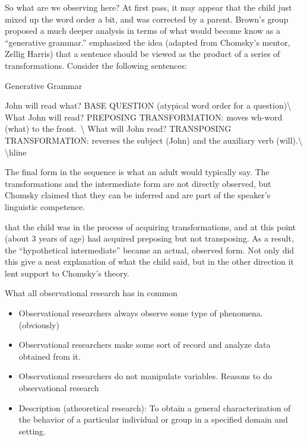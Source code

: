 \begin{refsection}
So what are we observing here? At first pass, it may appear that the child just mixed up the word order a bit, and was corrected by a parent. Brown's group proposed a much deeper analysis in terms of what would become know as a ``generative grammar.''
 emphasized the idea (adapted from Chomsky's mentor, Zellig Harris) that a sentence should be viewed as the product of a series of transformations. Consider the following sentences:

\begin{apatextbox}{Generative Grammar}

John will read what? BASE QUESTION (atypical word order for a question)\textbackslash{} What John will read? PREPOSING TRANSFORMATION: moves wh-word (what) to the front. \textbackslash{} What will John read? TRANSPOSING TRANSFORMATION: reverses the subject (John) and the auxiliary verb (will).\textbackslash{} \textbackslash{}hline
\end{apatextbox}
The final form in the sequence is what an adult would typically say. The transformations and the intermediate form are not directly observed, but Chomsky claimed that they can be inferred and are part of the speaker's linguistic competence.

 that the child was in the process of acquiring transformations, and at this point (about 3 years of age) had acquired preposing but not transposing. As a result, the ``hypothetical intermediate'' became an actual, observed form. Not only did this give a neat explanation of what the child said, but in the other direction it lent support to Chomsky's theory. ~\citep{Brown:1972to} ~\citep{Chomsky:1965uu}

What all observational research has in common

\begin{itemize}
\item Observational researchers always observe some type of phenomena. (obviously)

\item Observational researchers make some sort of record and analyze data obtained from it.

\item Observational researchers do not manipulate variables.
Reasons to do observational research

\item Description (atheoretical research): To obtain a general characterization of the behavior of a particular individual or group in a specified domain and setting.


\end{itemize}
\end{refsection}
